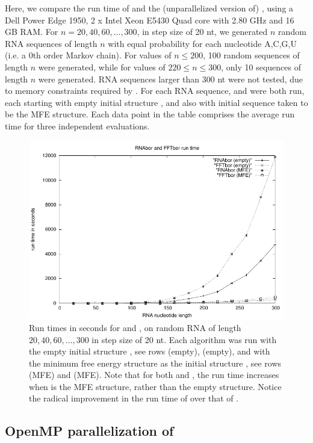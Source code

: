 Here, we compare the run time of \rnabor \cite{Freyhult.b07} and
the (unparallelized version of) \fftbor, using
a Dell Power Edge 1950, 2 x Intel Xeon E5430 Quad
core with 2.80 GHz and 16 GB RAM. For $n = 20,40,60,\dots,300$, in step
size of 20 nt, we generated $n$ random RNA sequences of length $n$ with equal
probability for each nucleotide A,C,G,U (i.e. a $0$th order Markov chain).
For values of $n \leq 200$, 100 random sequences of length
$n$ were generated, while for values of $220 \leq n \leq 300$, only
10 sequences of length $n$ were generated.
RNA sequences larger than 300 nt were not tested,
due to  memory constraints required by \rnabor.
For each RNA sequence, \rnabor and \fftbor were both run,
each starting with empty initial structure \strSt, and also
with initial sequence \strSt taken to be the MFE structure.
Each data point in the table comprises the average run time for three
independent evaluations.

\begin{figure}[!ht]
\centering
\includegraphics[width=.9\textwidth]{Figures/FFTbor/benchmarking.pdf}
\caption{Run times in seconds for \rnabor and \fftbor, on random RNA
of length $20,40,60,\dots,300$ in step size of 20 nt. Each algorithm
was run with the empty initial structure \strSt, see rows
\rnabor (empty), \fftbor (empty), and with the minimum free
energy structure as the initial structure \strSt, see rows
\rnabor (MFE) and \fftbor (MFE). Note that for both \rnabor
and \fftbor, the run time increases when \strSt is the MFE structure,
rather than the empty structure. Notice the radical improvement in the
run time of \fftbor over that of \rnabor.
}
\label{fig:fftbor:benchmarking}
\end{figure}

\subsection{OpenMP parallelization of \fftbor}
\label{subsec:fftbor:openmp}

